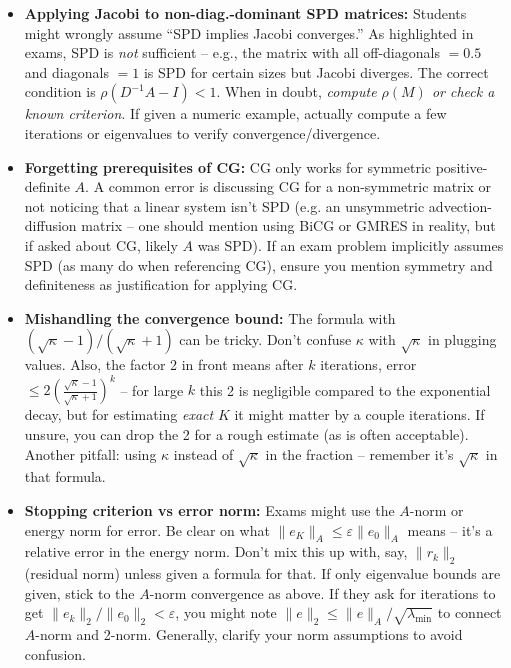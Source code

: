 \documentclass[a4paper,11pt]{article}
\begin{document}
\begin{itemize}
    \item \textbf{Applying Jacobi to non-diag.-dominant SPD matrices:} 
    Students might wrongly assume \enquote{SPD implies Jacobi converges.}
    \medskip
    As highlighted in exams, SPD is \textit{not} sufficient -- e.g., the matrix with all off-diagonals $=0.5$ and diagonals $=1$ is SPD for certain sizes but Jacobi diverges. 
    \medskip
    The correct condition is $\rho(D^{-1}A - I)<1$. When in doubt, \textit{compute $\rho(M)$ or check a known criterion}. If given a numeric example, actually compute a few iterations or eigenvalues to verify convergence/divergence.
    \item \textbf{Forgetting prerequisites of CG:} CG only works for symmetric positive-definite $A$. A common error is discussing CG for a non-symmetric matrix or not noticing that a linear system isn't SPD (e.g. an unsymmetric advection-diffusion matrix -- one should mention using BiCG or GMRES in reality, but if asked about CG, likely $A$ was SPD). If an exam problem implicitly assumes SPD (as many do when referencing CG), ensure you mention symmetry and definiteness as justification for applying CG.
    \item \textbf{Mishandling the convergence bound:} The formula with $(\sqrt{\kappa}-1)/(\sqrt{\kappa}+1)$ can be tricky. Don't confuse $\kappa$ with $\sqrt{\kappa}$ in plugging values. Also, the factor 2 in front means after $k$ iterations, error $\le 2(\frac{\sqrt{\kappa}-1}{\sqrt{\kappa}+1})^k$ -- for large $k$ this 2 is negligible compared to the exponential decay, but for estimating \textit{exact} $K$ it might matter by a couple iterations. If unsure, you can drop the 2 for a rough estimate (as is often acceptable). Another pitfall: using $\kappa$ instead of $\sqrt{\kappa}$ in the fraction -- remember it's $\sqrt{\kappa}$ in that formula.
    \item \textbf{Stopping criterion vs error norm:} Exams might use the $A$-norm or energy norm for error. Be clear on what $\|e_K\|_A \le \varepsilon \|e_0\|_A$ means -- it's a relative error in the energy norm. Don't mix this up with, say, $\|r_k\|_2$ (residual norm) unless given a formula for that. If only eigenvalue bounds are given, stick to the $A$-norm convergence as above. If they ask for iterations to get $\|e_k\|_2/\|e_0\|_2 < \varepsilon$, you might note $\|e\|_2 \le \|e\|_A/\sqrt{\lambda_{\min}}$ to connect $A$-norm and 2-norm. Generally, clarify your norm assumptions to avoid confusion.
\end{itemize}
\end{document}

